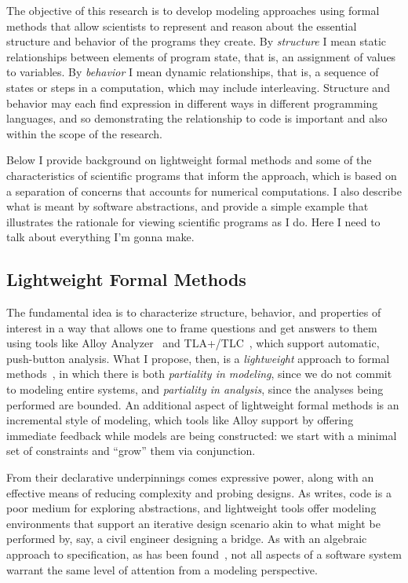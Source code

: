 \documentclass[11pt]{article}
\begin{document}
The objective of this research is to develop modeling approaches using
formal methods that allow scientists to represent and reason about the
essential structure and behavior of the programs they create.  By
\emph{structure} I mean static relationships between elements of program
state, that is, an assignment of values to
variables. By \emph{behavior} I mean dynamic relationships, that is,
a sequence of states or steps in a computation, which may include
interleaving.  Structure and behavior may each find expression in
different ways in different programming languages, and so
demonstrating the relationship to code is
important and also within the scope of the research.

Below I provide background on lightweight formal methods and some of the characteristics of scientific programs that inform the approach, which is based on a separation of concerns that accounts for numerical computations.  I also describe what is meant by software abstractions, and provide a simple example that illustrates the rationale for viewing scientific programs as I do.  
Here I need to talk about everything I'm gonna make.

\subsection{Lightweight Formal Methods}

The fundamental idea is to characterize structure, behavior, and
properties of interest in a way that allows one to frame questions and
get answers to them using tools like Alloy
Analyzer~\citep{jackson2012} and
TLA+/\allowbreak{}TLC~\citep{lamport2002}, which support automatic,
push-button analysis.  What I propose, then, is a \emph{lightweight}
approach to formal methods~\citep{jackson1996b}, in which there is
both \emph{partiality in modeling}, since we do not commit to modeling
entire systems, and \emph{partiality in analysis}, since the analyses
being performed are bounded.  An additional aspect of lightweight
formal methods is an incremental style of modeling, which tools like
Alloy support by offering immediate feedback while models are being
constructed: we start with a minimal set of constraints and ``grow''
them via conjunction.

From their declarative underpinnings comes expressive power, along
with an effective means of reducing complexity and probing designs.
As \cite{jackson2012} writes, code is a poor medium for exploring
abstractions, and lightweight tools offer modeling environments that
support an iterative design scenario akin to what might be performed
by, say, a civil engineer designing a bridge.  As with an algebraic
approach to specification, as has been found~\citep{baugh1992b}, not
all aspects of a software system warrant the same level of attention
from a modeling perspective.
\end{document}
